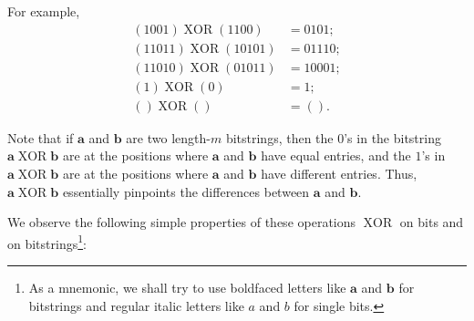 \documentclass[numbers=enddot,12pt,final,onecolumn,notitlepage]{scrartcl}%
\numberwithin{exer}{subsection}
\theoremstyle{definition}
\begin{document}
For example,%
\begin{align*}
\left(  1001\right)  \operatorname*{XOR}\left(  1100\right)   &  =0101;\\
\left(  11011\right)  \operatorname*{XOR}\left(  10101\right)   &  =01110;\\
\left(  11010\right)  \operatorname*{XOR}\left(  01011\right)   &  =10001;\\
\left(  1\right)  \operatorname*{XOR}\left(  0\right)   &  =1;\\
\left(  {}\right)  \operatorname*{XOR}\left(  {}\right)   &  =\left(
{}\right)  .
\end{align*}


Note that if $\mathbf{a}$ and $\mathbf{b}$ are two length-$m$ bitstrings, then
the $0$'s in the bitstring $\mathbf{a}\operatorname*{XOR}\mathbf{b}$ are at
the positions where $\mathbf{a}$ and $\mathbf{b}$ have equal entries, and the
$1$'s in $\mathbf{a}\operatorname*{XOR}\mathbf{b}$ are at the positions where
$\mathbf{a}$ and $\mathbf{b}$ have different entries. Thus, $\mathbf{a}%
\operatorname*{XOR}\mathbf{b}$ essentially pinpoints the differences between
$\mathbf{a}$ and $\mathbf{b}$.

We observe the following simple properties of these operations
$\operatorname*{XOR}$ on bits and on bitstrings\footnote{As a mnemonic, we
shall try to use boldfaced letters like $\mathbf{a}$ and $\mathbf{b}$ for
bitstrings and regular italic letters like $a$ and $b$ for single bits.}:
\end{document}
